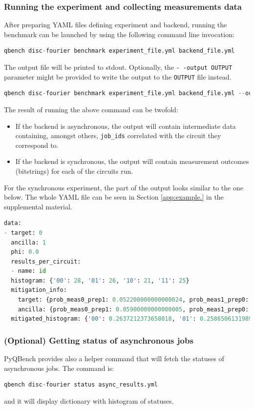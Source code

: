 \documentclass[preprint,12pt, a4paper, dvipsnames]{elsarticle}
\newcommand{\1}{{\rm 1\hspace{-0.9mm}l}}
\theoremstyle{definition}
\begin{document}
\subsubsection{Running the experiment and collecting measurements data}
After preparing YAML files defining experiment and backend,
running the benchmark can be launched by using the following command line invocation:
\begin{lstlisting}[language=Python]
qbench disc-fourier benchmark experiment_file.yml backend_file.yml
\end{lstlisting}
The output file will be printed to stdout. Optionally, the \texttt{- -output OUTPUT} parameter might
be provided to write the output to the \texttt{OUTPUT} file instead.
\begin{lstlisting}[language=Python]
qbench disc-fourier benchmark experiment_file.yml backend_file.yml --output async_results.yml
\end{lstlisting}
The result of running the above command can be twofold:
\begin{itemize}
	\item If the backend is asynchronous, the output will contain intermediate data containing, amongst
		others, \texttt{job\_ids} correlated with the circuit they correspond to.
	\item If the backend is synchronous, the output will contain measurement outcomes (bitstrings)
		for each of the circuits run.
\end{itemize}

For the synchronous experiment, the part of the output looks similar to the one below. The whole YAML
file can be seen in Section \ref{app:example.} in the supplemental material.
\begin{lstlisting}[language=Python]
data:
- target: 0
  ancilla: 1
  phi: 0.0
  results_per_circuit:
  - name: id
  histogram: {'00': 28, '01': 26, '10': 21, '11': 25}
  mitigation_info:
	target: {prob_meas0_prep1: 0.052200000000000024, prob_meas1_prep0: 0.0172}
	ancilla: {prob_meas0_prep1: 0.05900000000000005, prob_meas1_prep0: 0.0202}
  mitigated_histogram: {'00': 0.2637212373658018, '01': 0.25865061319892463, '10': 0.2067279352110304, '11': 0.2709002142242433}
\end{lstlisting}

\subsubsection{(Optional) Getting status of asynchronous jobs}
 PyQBench provides also a helper command that will fetch the statuses of asynchronous jobs. The command is:
\begin{lstlisting}[language=Python]
qbench disc-fourier status async_results.yml
\end{lstlisting}
and it will display dictionary with histogram of statuses.
\end{document}
